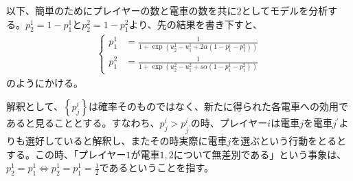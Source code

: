 \documentclass{jsarticle}
\begin{document}
以下、簡単のためにプレイヤーの数と電車の数を共に$2$としてモデルを分析する。$p_2^1 = 1 - p_1^1$と$p_2^2 = 1 - p_1^2$より、先の結果を書き下すと、
\begin{align*}
	\begin{cases}p_1^1 &= \frac{1}{1 + \exp(u_2^1 - u_1^1 + 2\alpha(1 - p_1^1 - p_1^2))} \\[10pt]
	p_1^2 &= \frac{1}{1 + \exp(u_2^2 - u_1^2 + s\alpha(1 -p_1^1 -p_1^2))}
	\end{cases}
\end{align*}
のようにかける。

解釈として、$\left\{ p_j^i\right\}$は確率そのものではなく、新たに得られた各電車への効用であると見ることとする。すなわち、$p_j^i > p_{j^{'}}^i$の時、プレイヤー$i$は電車$j$を電車$j^{'}$よりも選好していると解釈し、またその時実際に電車$j$を選ぶという行動をとるとする。この時、「プレイヤー$1$が電車$1,2$について無差別である」という事象は、$p_2^1 = p_1^1 \Leftrightarrow p_2^1 = p_1^1 = \frac{1}{2}$であるということを指す。
\end{document}
